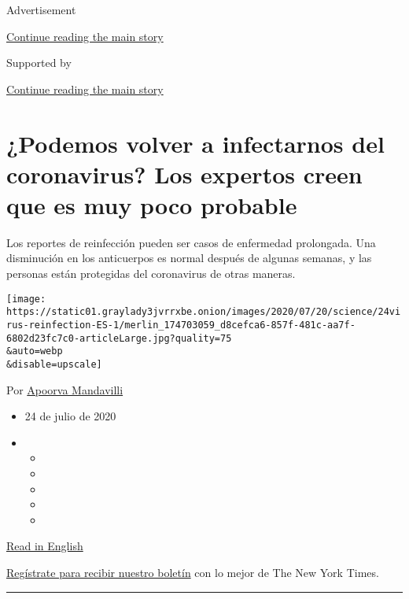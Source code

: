 Advertisement

\protect\hyperlink{after-top}{Continue reading the main story}

Supported by

\protect\hyperlink{after-sponsor}{Continue reading the main story}

\hypertarget{podemos-volver-a-infectarnos-del-coronavirus-los-expertos-creen-que-es-muy-poco-probable}{%
\section{¿Podemos volver a infectarnos del coronavirus? Los expertos
creen que es muy poco
probable}\label{podemos-volver-a-infectarnos-del-coronavirus-los-expertos-creen-que-es-muy-poco-probable}}

Los reportes de reinfección pueden ser casos de enfermedad prolongada.
Una disminución en los anticuerpos es normal después de algunas semanas,
y las personas están protegidas del coronavirus de otras maneras.

\texttt{[image: https://static01.graylady3jvrrxbe.onion/images/2020/07/20/science/24virus-reinfection-ES-1/merlin\_174703059\_d8cefca6-857f-481c-aa7f-6802d23fc7c0-articleLarge.jpg?quality=75\\\&auto=webp\\\&disable=upscale]}

Por
\href{https://www.nytimes3xbfgragh.onion/by/apoorva-mandavilli}{Apoorva
Mandavilli}

\begin{itemize}
\item
  24 de julio de 2020
\item
  \begin{itemize}
  \item
  \item
  \item
  \item
  \item
  \end{itemize}
\end{itemize}

\href{https://www.nytimes3xbfgragh.onion/2020/07/22/health/covid-antibodies-herd-immunity.html}{Read
in English}

\href{https://www.nytimes3xbfgragh.onion/newsletters/el-times}{Regístrate
para recibir nuestro boletín} con lo mejor de The New York Times.

\begin{center}\rule{0.5\linewidth}{\linethickness}\end{center}


